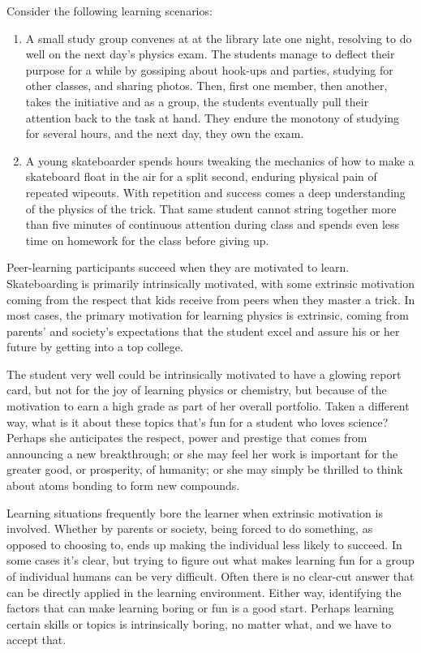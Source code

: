 Consider the following learning scenarios:

\begin{enumerate}
\item
  A small study group convenes at
  at the library late one night, resolving to do well on the next day's
  physics exam. The students manage to deflect their purpose for a while by
  gossiping about hook-ups and parties, studying for other classes, and
  sharing photos. Then, first one member, then another, takes the
  initiative and as a group, the students eventually pull their
  attention back to the task at hand. They endure the monotony of
  studying for several hours, and the next day, they own the exam.
\item
  A young skateboarder spends hours tweaking the mechanics of how to
  make a skateboard float in the air for a split second, enduring
  physical pain of repeated wipeouts. With repetition and success comes
  a deep understanding of the physics of the trick. That same student
  cannot string together more than five minutes of continuous attention
  during class and spends even less time on homework for the class
  before giving up.
\end{enumerate}
Peer-learning participants succeed when they are motivated to learn.
Skateboarding is primarily intrinsically motivated, with some extrinsic
motivation coming from the respect that kids receive from peers when
they master a trick. In most cases, the primary motivation for learning
physics is extrinsic, coming from parents' and society's expectations
that the student excel and assure his or her future by getting into a
top college.

The student very well could be intrinsically motivated to have a glowing
report card, but not for the joy of learning physics or chemistry, but
because of the motivation to earn a high grade as part of her overall
portfolio. Taken a different way, what is it about these topics that's
fun for a student who loves science? Perhaps she anticipates the
respect, power and prestige that comes from announcing a new
breakthrough; or she may feel her work is important for the greater
good, or prosperity, of humanity; or she may simply be thrilled to think
about atoms bonding to form new compounds.

Learning situations frequently bore the learner when extrinsic
motivation is involved. Whether by parents or society, being forced to
do something, as opposed to choosing to, ends up making the individual
less likely to succeed. In some cases it's clear, but trying to figure
out what makes learning fun for a group of individual humans can be very
difficult. Often there is no clear-cut answer that can be directly
applied in the learning environment. Either way, identifying the factors
that can make learning boring or fun is a good start. Perhaps learning
certain skills or topics is intrinsically boring, no matter what, and we
have to accept that.

